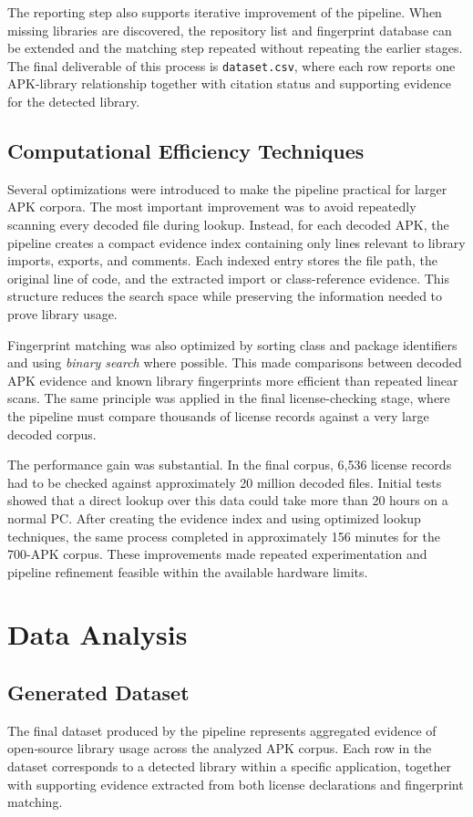 \documentclass[12pt,a4paper]{report}
\begin{document}
The reporting step also supports iterative improvement of the pipeline. When missing libraries are discovered, the repository list and fingerprint database can be extended and the matching step repeated without repeating the earlier stages. The final deliverable of this process is \texttt{dataset.csv}, where each row reports one APK-library relationship together with citation status and supporting evidence for the detected library.

\section{Computational Efficiency Techniques}
Several optimizations were introduced to make the pipeline practical for larger APK corpora. The most important improvement was to avoid repeatedly scanning every decoded file during lookup. Instead, for each decoded APK, the pipeline creates a compact evidence index containing only lines relevant to library imports, exports, and comments. Each indexed entry stores the file path, the original line of code, and the extracted import or class-reference evidence. This structure reduces the search space while preserving the information needed to prove library usage.

Fingerprint matching was also optimized by sorting class and package identifiers and using \textit{binary search} where possible. This made comparisons between decoded APK evidence and known library fingerprints more efficient than repeated linear scans. The same principle was applied in the final license-checking stage, where the pipeline must compare thousands of license records against a very large decoded corpus.

The performance gain was substantial. In the final corpus, 6,536 license records had to be checked against approximately 20 million decoded files. Initial tests showed that a direct lookup over this data could take more than 20 hours on a normal PC. After creating the evidence index and using optimized lookup techniques, the same process completed in approximately 156 minutes for the 700-APK corpus. These improvements made repeated experimentation and pipeline refinement feasible within the available hardware limits.

\chapter{Data Analysis}

\section{Generated Dataset}
The final dataset produced by the pipeline represents aggregated evidence of open‑source library usage across the analyzed APK corpus. Each row in the dataset corresponds to a detected library within a specific application, together with supporting evidence extracted from both license declarations and fingerprint matching.
\end{document}
